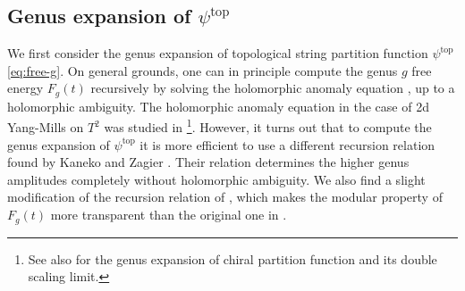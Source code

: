 \documentclass[11pt]{article}
\renewcommand{\[}{\begin{eqnarray}}
\renewcommand{\]}{\end{eqnarray}}
\begin{document}
\subsection{Genus expansion of $\psi^{\text{top}}$\label{subsec:genustop}}

We first consider the genus expansion of 
topological string partition function $\psi^{\text{top}}$ \eqref{eq:free-g}.
On general grounds, one can in principle compute the genus $g$ free
energy $F_g(t)$ recursively by solving the holomorphic anomaly equation \cite{Bershadsky:1993cx},
up to a holomorphic ambiguity.
The holomorphic anomaly equation in the case of 2d Yang-Mills on $T^2$
was studied in \cite{Dijkgraaf:1996iy,dijk}\footnote{
See also \cite{Griguolo:2004uz,Griguolo:2004jp} for 
the genus expansion of chiral partition function and its double scaling limit.}.
However,
it turns out that to compute the genus expansion of $\psi^{\text{top}}$
it is more efficient to use a different recursion relation
found by Kaneko and Zagier \cite{zagier}. Their relation determines
the higher genus 
amplitudes completely without holomorphic ambiguity.
We also find a slight modification
of the recursion relation of \cite{zagier},
which makes the modular property of $F_g(t)$ more transparent than the original 
one in \cite{zagier}.
\end{document}
